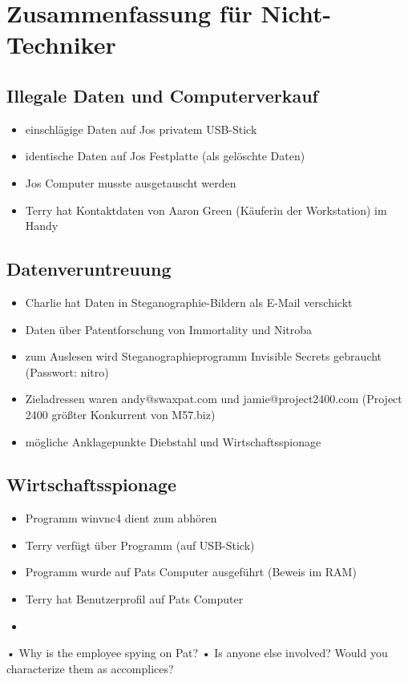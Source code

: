 \chapter{Zusammenfassung für Nicht-Techniker}
\label{sec:nicht_tec}

\section{Illegale Daten und Computerverkauf}
\label{sec:illegale_daten}
\begin{itemize}
	\item einschlägige Daten auf Jos privatem USB-Stick
	\item identische Daten auf Jos Festplatte (als gelöschte Daten)
	\item Jos Computer musste ausgetauscht werden
	\item Terry hat Kontaktdaten von Aaron Green (Käuferin der Workstation) im Handy
\end{itemize}

\section{Datenveruntreuung}
\label{sec:veruntreuung}
\begin{itemize}
	\item Charlie hat Daten in Steganographie-Bildern als E-Mail verschickt
	\item Daten über Patentforschung von Immortality und Nitroba
	\item zum Auslesen wird Steganographieprogramm Invisible Secrets gebraucht (Passwort: nitro)
	\item Zieladressen waren andy@swaxpat.com und jamie@project2400.com (Project 2400 größter Konkurrent von M57.biz)
	\item mögliche Anklagepunkte Diebstahl und Wirtschaftsspionage
\end{itemize}

\section{Wirtschaftsspionage}
\label{sec:spionage}
\begin{itemize}
	\item Programm winvnc4 dient zum abhören
	\item Terry verfügt über Programm (auf USB-Stick)
	\item Programm wurde auf Pats Computer ausgeführt (Beweis im RAM)
	\item Terry hat Benutzerprofil auf Pats Computer
	\item 
\end{itemize}
• Why is the employee spying on Pat?
• Is anyone else involved? Would you characterize them as accomplices?
